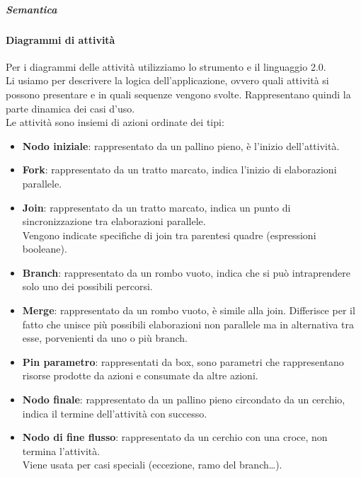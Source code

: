 		

		\subparagraph{Semantica} %


		\paragraph{Diagrammi di attività}\label{PP:Sviluppo:DiagrammiAttività} %
        Per i diagrammi delle attività utilizziamo lo strumento  e il linguaggio  2.0.\\
		Li usiamo per descrivere la logica dell'applicazione, ovvero quali attività si possono presentare e in quali sequenze vengono svolte. Rappresentano quindi la parte dinamica dei casi d'uso.\\
        Le attività sono insiemi di azioni ordinate dei tipi:
        \begin{itemize}
            \item \textbf{Nodo iniziale}: rappresentato da un pallino pieno, è l'inizio dell'attività.
            \item \textbf{Fork}: rappresentato da un tratto marcato, indica l'inizio di elaborazioni parallele.
            \item \textbf{Join}: rappresentato da un tratto marcato, indica un punto di sincronizzazione tra elaborazioni parallele.\\
                Vengono indicate specifiche di join tra parentesi quadre (espressioni booleane).
            \item \textbf{Branch}: rappresentato da un rombo vuoto, indica che si può intraprendere solo uno dei possibili percorsi.
            \item \textbf{Merge}: rappresentato da un rombo vuoto, è simile alla join. Differisce per il fatto che unisce più possibili elaborazioni non parallele ma in alternativa tra esse, porvenienti da uno o più branch.
            \item \textbf{Pin parametro}: rappresentati da box, sono parametri che rappresentano risorse prodotte da azioni e consumate da altre azioni.
            \item \textbf{Nodo finale}: rappresentato da un pallino pieno circondato da un cerchio, indica il termine dell'attività con successo.
            \item \textbf{Nodo di fine flusso}: rappresentato da un cerchio con una croce, non termina l'attività.\\
                Viene usata per casi speciali (eccezione, ramo del branch\dots).
        \end{itemize}
